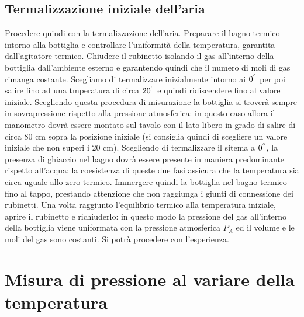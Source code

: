 \subsection{Termalizzazione iniziale dell'aria}
Procedere quindi con la termalizzazione dell'aria.
Preparare il bagno termico intorno alla bottiglia e controllare l'uniformità della temperatura, garantita dall'agitatore termico.
Chiudere il rubinetto isolando il gas all'interno della bottiglia dall'ambiente esterno e garantendo quindi che il numero di moli di gas rimanga costante.
Scegliamo di termalizzare inizialmente intorno ai $0^{\degree}$ per poi salire fino ad una tmperatura di circa $20^{\degree}$ e quindi ridiscendere fino al valore iniziale.
Scegliendo questa procedura di misurazione la bottiglia si troverà sempre in sovrapressione rispetto alla pressione atmosferica: in questo caso allora il manometro dovrà essere montato sul tavolo con il lato libero in grado di salire di circa 80 cm sopra la posizione iniziale (si consiglia quindi di scegliere un valore iniziale che non superi i 20 cm).
Scegliendo di termalizzare il sitema a $0^{\degree}$, la presenza di ghiaccio nel bagno dovrà essere presente in maniera predominante rispetto all'acqua: la coesistenza di queste due fasi assicura che la temperatura sia circa uguale allo zero termico.
Immergere quindi la bottiglia nel bagno termico fino al tappo, prestando attenzione che non raggiunga i giunti di connessione dei rubinetti.
Una volta raggiunto l'equilibrio termico alla temperatura iniziale, aprire il rubinetto e richiuderlo: in questo modo la pressione del gas all'interno della bottiglia viene uniformata con la pressione atmosferica $P_{A}$ ed il volume e le moli del gas sono costanti. 
Si potrà procedere con l'esperienza.


\section{Misura di pressione al variare della temperatura}
